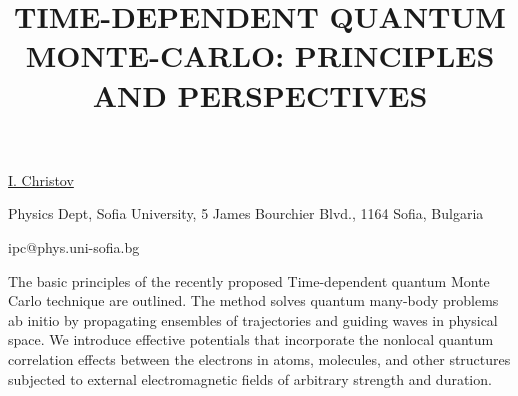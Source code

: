 \title{TIME-DEPENDENT QUANTUM MONTE-CARLO: \mbox{PRINCIPLES} AND PERSPECTIVES}

\underline{I. Christov} 

{\normalsize{\vspace{-4mm}
Physics Dept, Sofia University, 5 James Bourchier Blvd., 1164 Sofia,
Bulgaria

\email ipc@phys.uni-sofia.bg}}

The basic principles of the recently proposed Time-dependent quantum Monte Carlo technique
are outlined. The method solves quantum many-body problems ab initio by
propagating ensembles of trajectories and guiding waves in physical space.
We introduce effective potentials that incorporate the nonlocal quantum correlation effects between the electrons in atoms, molecules, and other structures subjected to external electromagnetic fields of arbitrary strength and duration.

\vspace{\baselineskip}